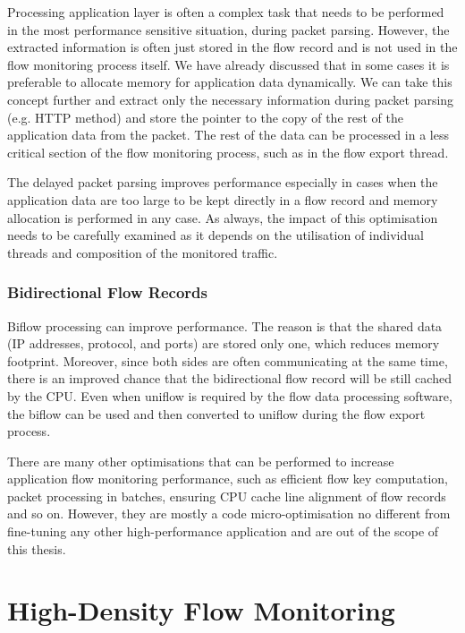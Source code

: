 Processing application layer is often a complex task that needs to be performed in the most performance sensitive situation, during packet parsing. However, the extracted information is often just stored in the flow record and is not used in the flow monitoring process itself. We have already discussed that in some cases it is preferable to allocate memory for application data dynamically. We can take this concept further and extract only the necessary information during packet parsing (e.g. HTTP method) and store the pointer to the copy of the rest of the application data from the packet. The rest of the data can be processed in a less critical section of the flow monitoring process, such as in the flow export thread. 

The delayed packet parsing improves performance especially in cases when the application data are too large to be kept directly in a flow record and memory allocation is performed in any case. As always, the impact of this optimisation needs to be carefully examined as it depends on the utilisation of individual threads and composition of the monitored traffic.

\subsubsection{Bidirectional Flow Records}

Biflow processing can improve performance. The reason is that the shared data (IP addresses, protocol, and ports) are stored only one, which reduces memory footprint. Moreover, since both sides are often communicating at the same time, there is an improved chance that the bidirectional flow record will be still cached by the CPU. Even when uniflow is required by the flow data processing software, the biflow can be used and then converted to uniflow during the flow export process.


There are many other optimisations that can be performed to increase application flow monitoring performance, such as efficient flow key computation, packet processing in batches, ensuring CPU cache line alignment of flow records and so on. However, they are mostly a code micro-optimisation no different from fine-tuning any other high-performance application and are out of the scope of this thesis.


\section{High-Density Flow Monitoring}\label{sec:performance-high-density}

